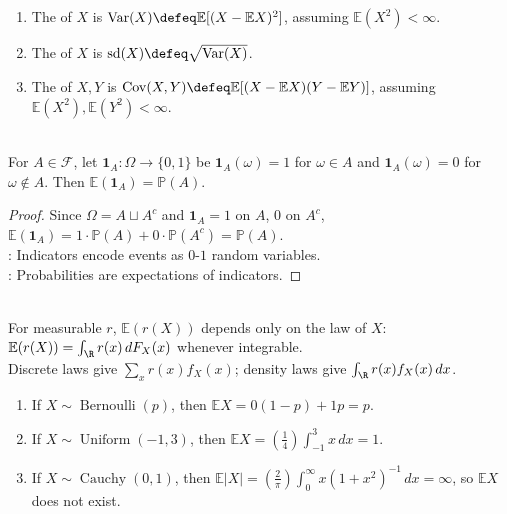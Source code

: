 \begin{definition} \label{def:variance-covariance-and-standard-deviation} 
\begin{enumerate}[label=(\roman*)]
\setlength{\itemsep}{0pt}
\item The  of $X$ is $\operatorname{Var}(X)\defeq\mathbb{E}[(X-\mathbb{E}X)^2]$, assuming $\mathbb{E}(X^2)<\infty$.
\item The  of $X$ is $\operatorname{sd}(X)\defeq\sqrt{\operatorname{Var}(X)}$.
\item The  of $X,Y$ is $\operatorname{Cov}(X,Y)\defeq\mathbb{E}[(X-\mathbb{E}X)(Y-\mathbb{E}Y)]$, assuming $\mathbb{E}(X^2),\mathbb{E}(Y^2)<\infty$.
\end{enumerate}
\end{definition}

\begin{proposition} \label{prop:indicator-expectation-probability} \\
For $A\in\mathcal{F}$, let $\mathbf{1}_A:\Omega\to\{0,1\}$ be $\mathbf{1}_A(\omega)=1$ for $\omega\in A$ and $\mathbf{1}_A(\omega)=0$ for $\omega\notin A$. Then $\mathbb{E}(\mathbf{1}_A)=\mathbb{P}(A)$.
\begin{proof}
Since $\Omega=A\sqcup A^c$ and $\mathbf{1}_A=1$ on $A$, $0$ on $A^c$, $\mathbb{E}(\mathbf{1}_A)=1\cdot\mathbb{P}(A)+0\cdot\mathbb{P}(A^c)=\mathbb{P}(A)$.\\
: Indicators encode events as $0$-$1$ random variables.\\
: Probabilities are expectations of indicators.
\end{proof}
\end{proposition}

\begin{remark} \label{rem:expectation-section-source-scope} \\
For measurable $r$, $\mathbb{E}(r(X))$ depends only on the law of $X$: $\mathbb{E}(r(X))=\int_{\R}r(x)\,dF_X(x)$ whenever integrable.\\
Discrete laws give $\sum\limits_x r(x)f_X(x)$; density laws give $\int_{\R}r(x)f_X(x)\,dx$.
\end{remark}

\begin{example} \label{ex:first-expectation-computations} 
\begin{enumerate}[label=(\roman*)]
\setlength{\itemsep}{0pt}
\item If $X\sim\operatorname{Bernoulli}(p)$, then $\mathbb{E}X=0(1-p)+1p=p$.
\item If $X\sim\operatorname{Uniform}(-1,3)$, then $\mathbb{E}X=(\frac{1}{4})\int_{-1}^{3}x\,dx=1$.
\item If $X\sim\operatorname{Cauchy}(0,1)$, then $\mathbb{E}|X|=(\frac{2}{\pi})\int_0^\infty x(1+x^2)^{-1}\,dx=\infty$, so $\mathbb{E}X$ does not exist.
\end{enumerate}
\end{example}

